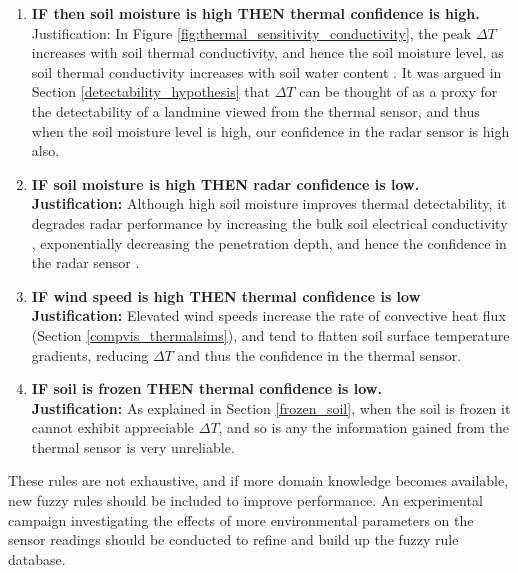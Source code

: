         \begin{enumerate}

        
            \item \textbf{IF then soil moisture is high THEN thermal confidence is high.}\\
                Justification: In Figure \ref{fig:thermal_sensitivity_conductivity}, the peak \(\Delta T\) increases with soil thermal conductivity, and hence the soil moisture level, as soil thermal conductivity increases with soil water content \cite{wu2025soil}. It was argued in Section \ref{detectability_hypothesis} that \(\Delta T\) can be thought of as a proxy for the detectability of a landmine viewed from the thermal sensor, and thus when the soil moisture level is high, our confidence in the radar sensor is high also.
            
             \item \textbf{IF soil moisture is high THEN radar confidence is low.} \\
                \textbf{Justification:} Although high soil moisture improves thermal detectability, it degrades radar performance by increasing the bulk soil electrical conductivity \cite{bai2013soils}, exponentially decreasing the penetration depth, and hence the confidence in the radar sensor \cite{giovanni2008penetration}.
        
          
            \item \textbf{IF wind speed is high THEN thermal confidence is low} \\
                \textbf{Justification:} Elevated wind speeds increase the rate of convective heat flux (Section \ref{compvis_thermalsims}), and tend to flatten soil surface temperature gradients, reducing \(\Delta T\) and thus the confidence in the thermal sensor.
          
            \item \textbf{IF soil is frozen THEN thermal confidence is low.} \\
                \textbf{Justification:} As explained in Section \ref{frozen_soil}, when the soil is frozen it cannot exhibit appreciable \(\Delta T\), and so is any the information gained from the thermal sensor is very unreliable.
 
        \end{enumerate}
        
        These rules are not exhaustive, and if more domain knowledge becomes available, new fuzzy rules should be included to improve performance. An experimental campaign investigating the effects of more environmental parameters on the sensor readings should be conducted to refine and build up the fuzzy rule database.

